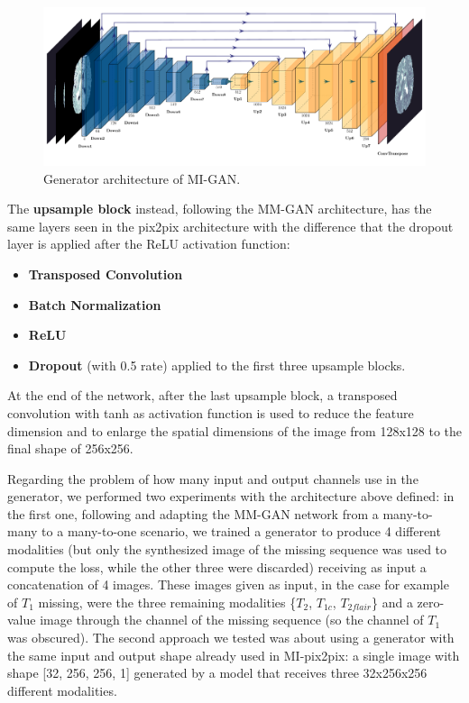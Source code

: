 \begin{figure}[H]
\centering
\includegraphics[height=0.263\textheight]{images/MIGAN_generator.pdf}
\caption[Generator architecture of MI-GAN]{Generator architecture of MI-GAN.}
\label{fig:MIGAN_generator}
\end{figure}

The \textbf{upsample block} instead, following the MM-GAN architecture, has the same layers seen in the pix2pix architecture with the difference that the dropout layer is applied after the ReLU activation function:

\begin{itemize}
\item \textbf{Transposed Convolution}
\item \textbf{Batch Normalization}
\item \textbf{ReLU}
\item \textbf{Dropout} (with 0.5 rate) applied to the first three upsample blocks.
\end{itemize}

At the end of the network, after the last upsample block, a transposed convolution with tanh as activation function is used to reduce the feature dimension and to enlarge the spatial dimensions of the image from 128x128 to the final shape of 256x256.

\vspace{5mm} %
Regarding the problem of how many input and output channels use in the generator, we performed two experiments with the architecture above defined: in the first one, following \cite{migan} and adapting the MM-GAN network from a many-to-many to a many-to-one scenario, we trained a generator to produce 4 different modalities (but only the synthesized image of the missing sequence was used to compute the loss, while the other three were discarded) receiving as input a concatenation of 4 images.
These images given as input, in the case for example of $T_{1}$ missing, were the three remaining modalities \{$T_{2}$, $T_{1c}$, $T_{2flair}$\} and a zero-value image through the channel of the missing sequence (so the channel of $T_{1}$ was obscured).
The second approach we tested was about using a generator with the same input and output shape already used in MI-pix2pix: a single image with shape [32, 256, 256, 1] generated by a model that receives three 32x256x256 different modalities.

